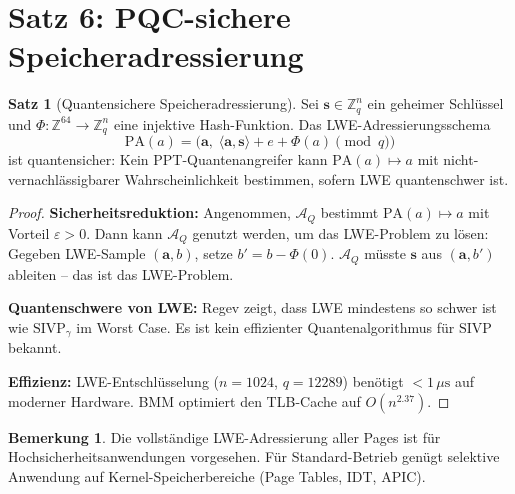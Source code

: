 ﻿\documentclass[a4paper,12pt]{scrreprt}
\theoremstyle{definition}
\newtheorem{satz}{Satz}[chapter]
\newtheorem{bemerkung}{Bemerkung}[chapter]
\begin{document}
	\section{Satz 6: PQC-sichere Speicheradressierung}
	
	\begin{satz}[Quantensichere Speicheradressierung]\label{satz:pqc_mem}
		Sei $\mathbf{s} \in \mathbb{Z}_q^n$ ein geheimer Schlüssel und
		$\Phi: \mathbb{Z}^{64} \to \mathbb{Z}_q^n$ eine injektive Hash-Funktion.
		Das LWE-Adressierungsschema
		\[
		\mathrm{PA}(a) = \bigl(\mathbf{a},\; \langle \mathbf{a}, \mathbf{s} \rangle
		+ e + \Phi(a) \pmod{q}\bigr)
		\]
		ist quantensicher: Kein PPT-Quantenangreifer kann $\mathrm{PA}(a) \mapsto a$
		mit nicht-vernachlässigbarer Wahrscheinlichkeit bestimmen, sofern LWE
		quantenschwer ist.
	\end{satz}
	
	\begin{proof}
		\textbf{Sicherheitsreduktion:} Angenommen, $\mathcal{A}_Q$ bestimmt
		$\mathrm{PA}(a) \mapsto a$ mit Vorteil $\varepsilon > 0$. Dann kann
		$\mathcal{A}_Q$ genutzt werden, um das LWE-Problem zu lösen: Gegeben
		LWE-Sample $(\mathbf{a}, b)$, setze $b' = b - \Phi(0)$.
		$\mathcal{A}_Q$ müsste $\mathbf{s}$ aus $(\mathbf{a}, b')$ ableiten --
		das ist das LWE-Problem.
		
		\textbf{Quantenschwere von LWE:} Regev \cite{Regev2009} zeigt, dass
		LWE mindestens so schwer ist wie $\mathrm{SIVP}_\gamma$ im Worst Case.
		Es ist kein effizienter Quantenalgorithmus für $\mathrm{SIVP}$ bekannt.
		
		\textbf{Effizienz:} LWE-Entschlüsselung ($n = 1024$, $q = 12289$)
		benötigt $< 1\,\mu\text{s}$ auf moderner Hardware. BMM \cite{Epp2026boolmm}
		optimiert den TLB-Cache auf $O(n^{2.37})$.
	\end{proof}
	
	\begin{bemerkung}
		Die vollständige LWE-Adressierung aller Pages ist für
		Hochsicherheitsanwendungen vorgesehen. Für Standard-Betrieb genügt
		selektive Anwendung auf Kernel-Speicherbereiche (Page Tables, IDT, APIC).
	\end{bemerkung}
	
	
\end{document}
